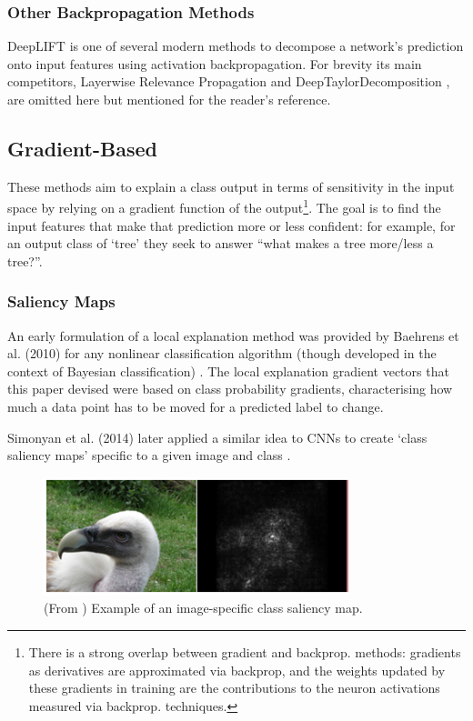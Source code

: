 \documentclass[main]{subfiles}
\begin{document}
\subsubsection{Other Backpropagation Methods}
DeepLIFT is one of several modern methods to decompose a network's prediction onto input features using activation backpropagation. For brevity its main competitors, Layerwise Relevance Propagation \cite{lrp} and DeepTaylorDecomposition \cite{taylor}, are omitted here but mentioned for the reader's reference.


\subsection{Gradient-Based} \label{sec:gradient}
These methods aim to explain a class output in terms of sensitivity in the input space by relying on a gradient function of the output\footnote{There is a strong overlap between gradient and backprop. methods: gradients as derivatives are approximated via backprop, and the weights updated by these gradients in training are the contributions to the neuron activations measured via backprop. techniques.}. The goal is to find the input features that make that prediction more or less confident: for example, for an output class of `tree' they seek to answer ``what makes a tree more/less a tree?''.

\subsubsection{Saliency Maps}
An early formulation of a local explanation method was provided by Baehrens et al. (2010) for any nonlinear classification algorithm (though developed in the context of Bayesian classification) \cite{saliencyI}. The local explanation gradient vectors that this paper devised were based on class probability gradients, characterising how much a data point has to be moved for a predicted label to change.

Simonyan et al. (2014) later applied a similar idea to CNNs to create `class saliency maps' specific to a given image and class \cite{saliencyII}. 

\begin{figure}[h]
\centering
\includegraphics[scale=0.8]{saliency.png}
\caption{(From \cite{saliencyII}) Example of an image-specific class saliency map.}
\label{saliencyimg}
\end{figure}
\end{document}
